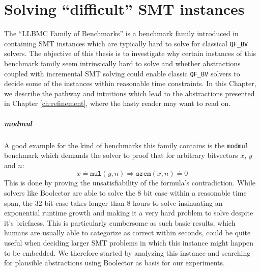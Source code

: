\chapter{Solving \enquote{difficult} SMT instances}
\label{ch:solving_hard_smt}
\label{sec:solving_hard_smt:llbmc_benchmarks}
The \enquote{LLBMC Family of Benchmarks} is a benchmark family introduced in \cite{sc2017-proceedings} containing SMT instances which are typically hard to solve for classical \texttt{QF\_BV} solvers. The objective of this thesis is to investigate why certain instances of this benchmark family seem intrinsically hard to solve and whether abstractions coupled with incremental SMT solving could enable classic \texttt{QF\_BV} solvers to decide some of the instances within reasonable time constraints.
In this Chapter, we describe the pathway and intuitions which lead to the abstractions presented in Chapter \ref{ch:refinement}, where the hasty reader may want to read on.

\paragraph{modmul}
A good example for the kind of benchmarks this family contains is the \texttt{modmul} benchmark which demands the solver to proof that for arbitrary bitvectors $x$, $y$ and $n$:
\[
x \doteq \texttt{mul}\left(y,n\right) \Rightarrow \texttt{srem}\left(x,n\right) \doteq 0
\]
This is done by proving the unsatisfiability of the formula's contradiction.
While solvers like Boolector are able to solve the 8 bit case within a reasonable time span, the 32 bit case takes longer than 8 hours to solve insinuating an exponential runtime growth and making it a very hard problem to solve despite it's briefness. This is particularly cumbersome as such basic results, which humans are usually able to categorize as correct within seconds, could be quite useful when deciding larger SMT problems in which this instance might happen to be embedded. We therefore started by analyzing this instance and searching for plausible abstractions using Boolector as basis for our experiments.

